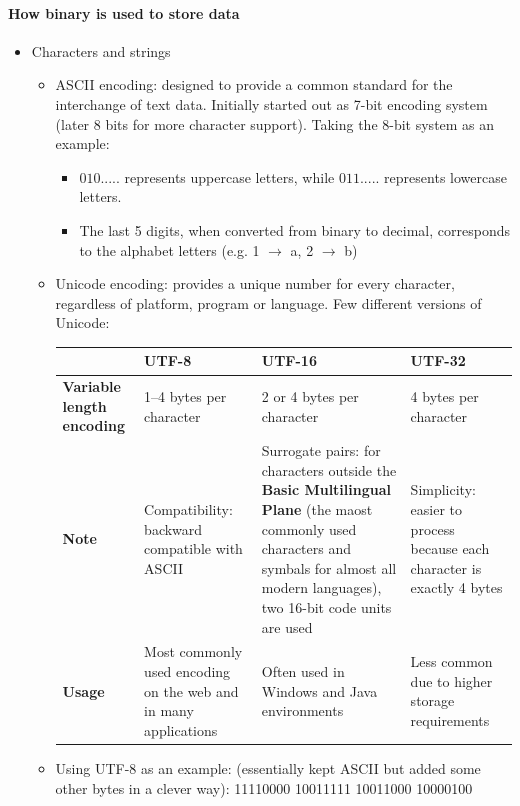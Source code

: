 \documentclass[a4paper,12pt]{article}
\begin{document}
\paragraph{How binary is used to store data}
\begin{itemize}
    \item Characters and strings
    \begin{itemize}
        \item ASCII encoding: designed to provide a common standard for the interchange of text data. Initially started out as 7-bit encoding system (later 8 bits for more character support). Taking the 8-bit system as an example:
\begin{itemize}
    \item $010.....$ represents uppercase letters, while $011.....$ represents lowercase letters.
    \item The last 5 digits, when converted from binary to decimal, corresponds to the alphabet letters (e.g. 1 $\rightarrow$ a, 2 $\rightarrow$ b)
\end{itemize}
	\item Unicode encoding: provides a unique number for every character, regardless of platform, program or language. Few different versions of Unicode:
	\begin{center}
		\renewcommand{\arraystretch}{1.5}
\begin{tabular}{|p{2cm}|p{4cm}|p{5.5cm}|p{4cm}|}
\hline
& \textbf{UTF-8} & \textbf{UTF-16} & \textbf{UTF-32} \\
\hline
\textbf{Variable length encoding} & 1--4 bytes per character & 2 or 4 bytes per character & 4 bytes per character \\
\hline
\textbf{Note} & Compatibility: backward compatible with ASCII & Surrogate pairs: for characters outside the \textbf{Basic Multilingual Plane} (the 
maost commonly used characters and symbals for almost all modern 
languages), two 16-bit code units are used & Simplicity: easier to process because each character is exactly 4 bytes \\
\hline
\textbf{Usage} & Most commonly used encoding on the web and in many applications & Often used in Windows and Java environments & Less common due to higher storage requirements \\
\hline
\end{tabular}
	\end{center}
\item Using UTF-8 as an example: (essentially kept ASCII but added some other bytes in a clever way): 11110000 10011111 10011000 10000100

\end{itemize}
\end{itemize}
\end{document}
